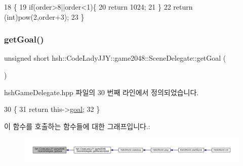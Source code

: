 \begin{DoxyCode}
18                                                                  \{
19                     \textcolor{keywordflow}{if}(order>8||order<1)\{
20                         \textcolor{keywordflow}{return} 1024;
21                     \}
22                     \textcolor{keywordflow}{return} (\textcolor{keywordtype}{int})pow(2,order+3);
23                 \}
\end{DoxyCode}
\mbox{\label{classhsh_1_1_code_lady_j_j_y_1_1game2048_1_1_scene_delegate_a5766c3d3f2f5ee3a4c7664198f362e8f}} 
\subsubsection{\texorpdfstring{get\+Goal()}{getGoal()}\hspace{0.1cm}{\footnotesize\ttfamily [2/2]}}
{\footnotesize\ttfamily unsigned short hsh\+::\+Code\+Lady\+J\+J\+Y\+::game2048\+::\+Scene\+Delegate\+::get\+Goal (\begin{DoxyParamCaption}{ }\end{DoxyParamCaption})\hspace{0.3cm}{\ttfamily [inline]}}



hsh\+Game\+Delegate.\+hpp 파일의 30 번째 라인에서 정의되었습니다.


\begin{DoxyCode}
30                                         \{
31                     \textcolor{keywordflow}{return} this->\hyperlink{classhsh_1_1_code_lady_j_j_y_1_1game2048_1_1_scene_delegate_a837886106e5ac017e4f57d8f56943e20}{goal};
32                 \}
\end{DoxyCode}
이 함수를 호출하는 함수들에 대한 그래프입니다.\+:
\nopagebreak
\begin{figure}[H]
\begin{center}
\leavevmode
\includegraphics[width=350pt]{d7/d4d/classhsh_1_1_code_lady_j_j_y_1_1game2048_1_1_scene_delegate_a5766c3d3f2f5ee3a4c7664198f362e8f_icgraph}
\end{center}
\end{figure}
\mbox{\label{classhsh_1_1_code_lady_j_j_y_1_1game2048_1_1_scene_delegate_af8998199e13c71f6598b1d61159d7aa0}} 
